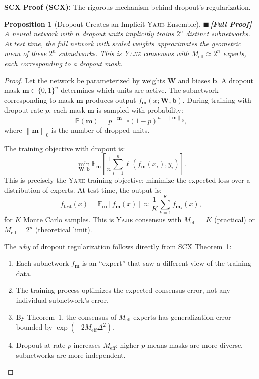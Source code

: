 \documentclass[12pt,a4paper]{article}
\newtheorem{proposition}[theorem]{Proposition}
\theoremstyle{definition}
\newcommand{\rigorFull}{{\color{rigorcolor}$\blacksquare$\,\textbf{[Full Proof]}}}
\newcommand{\Yajie}{\textsc{Yajie}}
\newcommand{\SCX}{\textsc{SCX}}
\newcommand{\E}{\mathbb{E}}
\newcommand{\Pbb}{\mathbb{P}}
\newcommand{\norm}[1]{\left\lVert#1\right\rVert}
\newcommand{\scxProof}{\noindent\textbf{SCX Proof (SCX):} }
\begin{document}
\scxProof{} The rigorous mechanism behind dropout's regularization.

\begin{proposition}[Dropout Creates an Implicit \Yajie{} Ensemble]\label{prop:dropout_yajie}
\rigorFull
A neural network with $n$ dropout units implicitly trains $2^n$ distinct subnetworks. At test time, the full network with scaled weights approximates the geometric mean of these $2^n$ subnetworks. This is \Yajie{} consensus with $M_{\text{eff}} \approx 2^n$ experts, each corresponding to a dropout mask.
\end{proposition}

\begin{proof}
Let the network be parameterized by weights $\mathbf{W}$ and biases $\mathbf{b}$. A dropout mask $\mathbf{m} \in \{0,1\}^n$ determines which units are active. The subnetwork corresponding to mask $\mathbf{m}$ produces output $f_{\mathbf{m}}(x; \mathbf{W}, \mathbf{b})$. During training with dropout rate $p$, each mask $\mathbf{m}$ is sampled with probability:
\begin{equation}
    \Pbb(\mathbf{m}) = p^{\norm{\mathbf{m}}_0} (1-p)^{n - \norm{\mathbf{m}}_0},
\end{equation}
where $\norm{\mathbf{m}}_0$ is the number of dropped units.

The training objective with dropout is:
\begin{equation}
    \min_{\mathbf{W}, \mathbf{b}} \E_{\mathbf{m}}\left[\frac{1}{n}\sum_{i=1}^n \ell(f_{\mathbf{m}}(x_i), y_i)\right].
\end{equation}
This is precisely the \Yajie{} training objective: minimize the expected loss over a distribution of experts. At test time, the output is:
\begin{equation}
    f_{\text{test}}(x) = \E_{\mathbf{m}}[f_{\mathbf{m}}(x)] \approx \frac{1}{K}\sum_{k=1}^K f_{\mathbf{m}_k}(x),
\end{equation}
for $K$ Monte Carlo samples. This is \Yajie{} consensus with $M_{\text{eff}} = K$ (practical) or $M_{\text{eff}} = 2^n$ (theoretical limit).

The \emph{why} of dropout regularization follows directly from \SCX{} Theorem~1:
\begin{enumerate}
    \item Each subnetwork $f_{\mathbf{m}}$ is an ``expert'' that saw a different view of the training data.
    \item The training process optimizes the expected consensus error, not any individual subnetwork's error.
    \item By Theorem~1, the consensus of $M_{\text{eff}}$ experts has generalization error bounded by $\exp(-2M_{\text{eff}}\Delta^2)$.
    \item Dropout at rate $p$ increases $M_{\text{eff}}$: higher $p$ means masks are more diverse, subnetworks are more independent.
\end{enumerate}
\end{proof}
\end{document}
